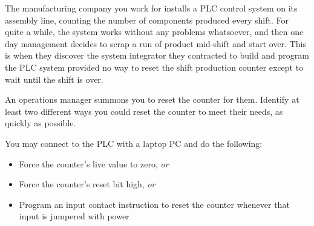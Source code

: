 

The manufacturing company you work for installs a PLC control system on its assembly line, counting the number of components produced every shift.  For quite a while, the system works without any problems whatsoever, and then one day management decides to scrap a run of product mid-shift and start over.  This is when they discover the system integrator they contracted to build and program the PLC system provided no way to reset the shift production counter except to wait until the shift is over.

\vskip 10pt

An operations manager summons you to reset the counter for them.  Identify at least two different ways you could reset the counter to meet their needs, as quickly as possible.














You may connect to the PLC with a laptop PC and do the following:

\begin{itemize}
\item{} Force the counter's live value to zero, {\it or}
\item{} Force the counter's reset bit high, {\it or}
\item{} Program an input contact instruction to reset the counter whenever that input is jumpered with power
\end{itemize}




